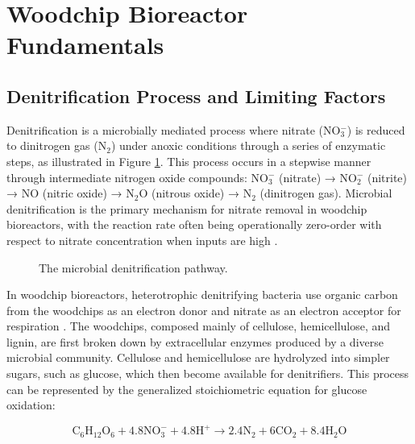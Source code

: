\documentclass[12pt,a4paper]{article}
\begin{document}
\section{Woodchip Bioreactor Fundamentals}

\subsection{Denitrification Process and Limiting Factors}

Denitrification is a microbially mediated process where nitrate (NO$_{3}^{-}$) is reduced to dinitrogen gas (N$_{2}$) under anoxic conditions through a series of enzymatic steps, as illustrated in Figure \ref{fig:denitrification_pathway}. This process occurs in a stepwise manner through intermediate nitrogen oxide compounds: NO$_{3}^{-}$ (nitrate) → NO$_{2}^{-}$ (nitrite) → NO (nitric oxide) → N$_{2}$O (nitrous oxide) → N$_{2}$ (dinitrogen gas). Microbial denitrification is the primary mechanism for nitrate removal in woodchip bioreactors, with the reaction rate often being operationally zero-order with respect to nitrate concentration when inputs are high \citep{RN625, RN242}.

\begin{figure}[ht]
\centering
\caption{The microbial denitrification pathway.}
\label{fig:denitrification_pathway}
\end{figure}

In woodchip bioreactors, heterotrophic denitrifying bacteria use organic carbon from the woodchips as an electron donor and nitrate as an electron acceptor for respiration \citep{RN242, RN725}. The woodchips, composed mainly of cellulose, hemicellulose, and lignin, are first broken down by extracellular enzymes produced by a diverse microbial community. Cellulose and hemicellulose are hydrolyzed into simpler sugars, such as glucose, which then become available for denitrifiers. This process can be represented by the generalized stoichiometric equation for glucose oxidation:

\begin{equation}
\text{C}_6\text{H}_{12}\text{O}_6 + 4.8\text{NO}_{3}^{-} + 4.8\text{H}^{+} \rightarrow 2.4\text{N}_{2} + 6\text{CO}_{2} + 8.4\text{H}_{2}\text{O}
\end{equation}
\end{document}
